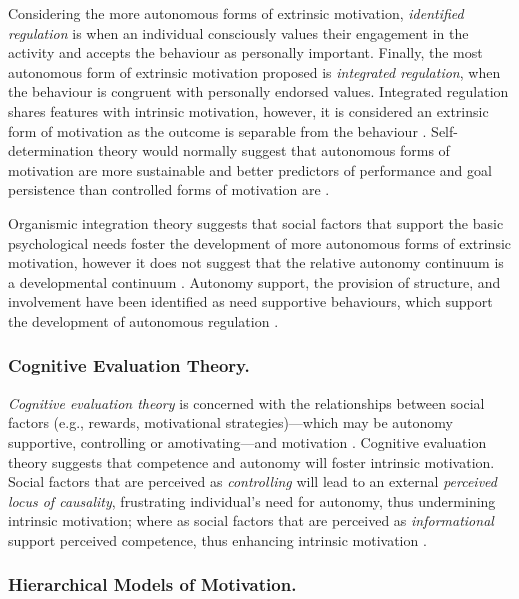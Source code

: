 \documentclass[
  12pt,
  a4paper,
]{book}
\begin{document}
Considering the more autonomous forms of extrinsic motivation, \emph{identified regulation} is when an individual consciously values their engagement in the activity and accepts the behaviour as personally important. Finally, the most autonomous form of extrinsic motivation proposed is \emph{integrated regulation}, when the behaviour is congruent with personally endorsed values. Integrated regulation shares features with intrinsic motivation, however, it is considered an extrinsic form of motivation as the outcome is separable from the behaviour \citep{Ryan2002}. Self-determination theory would normally suggest that autonomous forms of motivation are more sustainable and better predictors of performance and goal persistence than controlled forms of motivation are \citep{Hagger2015, Pelletier2001, Ryan2019}.

Organismic integration theory suggests that social factors that support the basic psychological needs foster the development of more autonomous forms of extrinsic motivation, however it does not suggest that the relative autonomy continuum is a developmental continuum \citep{Deci1991, Ryan1995, Ryan2002}. Autonomy support, the provision of structure, and involvement have been identified as need supportive behaviours, which support the development of autonomous regulation \citep{Ryan2016, Markland2010}.

\hypertarget{cognitive-evaluation-theory.}{%
\subsubsection{Cognitive Evaluation Theory.}\label{cognitive-evaluation-theory.}}

\emph{Cognitive evaluation theory} is concerned with the relationships between social factors (e.g., rewards, motivational strategies)---which may be autonomy supportive, controlling or amotivating---and motivation \citep{Deci1975, Deci1980}. Cognitive evaluation theory suggests that competence and autonomy will foster intrinsic motivation. Social factors that are perceived as \emph{controlling} will lead to an external \emph{perceived locus of causality}, frustrating individual's need for autonomy, thus undermining intrinsic motivation; where as social factors that are perceived as \emph{informational} support perceived competence, thus enhancing intrinsic motivation \citep{Ryan2019}.

\hypertarget{hierarchical-models-of-motivation.}{%
\subsubsection{Hierarchical Models of Motivation.}\label{hierarchical-models-of-motivation.}}
\end{document}
